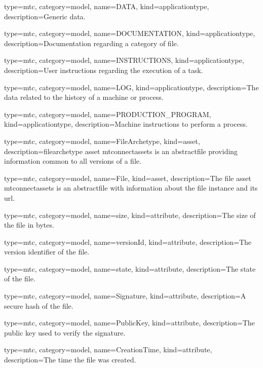 {
  type=mtc,
  category=model,
  name={DATA},
  kind={applicationtype},
  description={Generic data.}
}

{
  type=mtc,
  category=model,
  name={DOCUMENTATION},
  kind={applicationtype},
  description={Documentation regarding a category of file.}
}

{
  type=mtc,
  category=model,
  name={INSTRUCTIONS},
  kind={applicationtype},
  description={User instructions regarding the execution of a task.}
}

{
  type=mtc,
  category=model,
  name={LOG},
  kind={applicationtype},
  description={The data related to the history of a machine or process.}
}

{
  type=mtc,
  category=model,
  name={PRODUCTION\_PROGRAM},
  kind={applicationtype},
  description={Machine instructions to perform a process.}
}

{
  type=mtc,
  category=model,
  name={FileArchetype},
  kind={asset},
  description={\gls{filearchetype} \gls{asset mtconnectassets} is an \gls{abstractfile} providing information common to all versions of a file.}
}

{
  type=mtc,
  category=model,
  name={File},
  kind={asset},
  description={The \gls{file} \gls{asset mtconnectassets} is an \gls{abstractfile} with information about the \gls{file} instance and its \gls{url}.}
}

{
  type=mtc,
  category=model,
  name={size},
  kind={attribute},
  description={The size of the file in bytes.}
}

{
  type=mtc,
  category=model,
  name={versionId},
  kind={attribute},
  description={The version identifier of the file.}
}

{
  type=mtc,
  category=model,
  name={state},
  kind={attribute},
  description={The state of the file.}
}

{
  type=mtc,
  category=model,
  name={Signature},
  kind={attribute},
  description={A secure hash of the file.}
}

{
  type=mtc,
  category=model,
  name={PublicKey},
  kind={attribute},
  description={The public key used to verify the signature.}
}

{
  type=mtc,
  category=model,
  name={CreationTime},
  kind={attribute},
  description={The time the file was created.}
}

